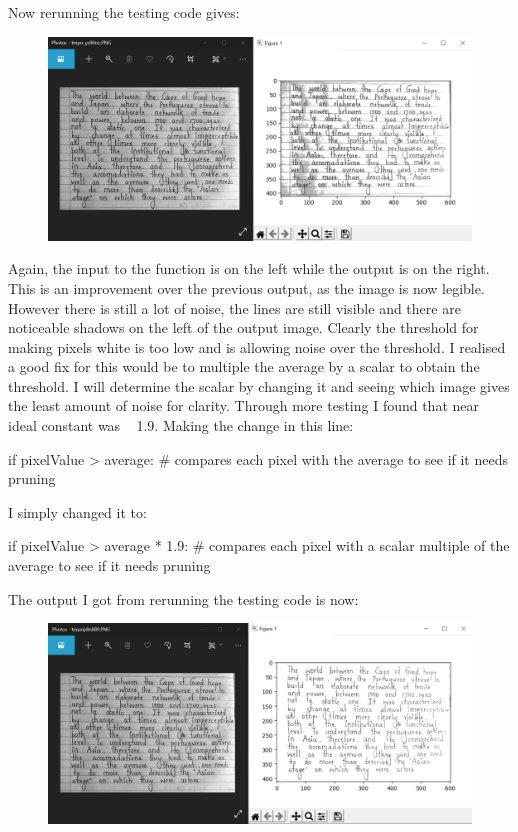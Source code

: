 \documentclass{report}
\begin{document}
Now rerunning the testing code gives:
\begin{figure}[H]
    \centering
    \includegraphics[width=5in]{Images/Development and Testing/Stage 4/Testing for Clean Image/Test 2, Too much noise.png}
    \label{fig:Testing for Clean Image: Test 2}
\end{figure}
\noindent Again, the input to the function is on the left while the output is on the right. This is an improvement over the previous output, as the image is now legible. However there is still a lot of noise, the lines are still visible and there are noticeable shadows on the left of the output image. Clearly the threshold for making pixels white is too low and is allowing noise over the threshold. I realised a good fix for this would be to multiple the average by a scalar to obtain the threshold. I will determine the scalar by changing it and seeing which image gives the least amount of noise for clarity.
\newline
Through more testing I found that near ideal constant was ~ 1.9. Making the change in this line:
\begin{python}
if pixelValue > average:  # compares each pixel with the average to see if it needs pruning
\end{python}
I simply changed it to:
\begin{python}
if pixelValue > average * 1.9:  # compares each pixel with a scalar multiple of the average to see if it needs pruning
\end{python}
The output I got from rerunning the testing code is now:
\begin{figure}[H]
    \centering
    \includegraphics[width=5in]{Images/Development and Testing/Stage 4/Testing for Clean Image/Test 3, Looks Good.png}
    \label{fig:Testing for Clean Image: Test 3}
\end{figure}
\end{document}
